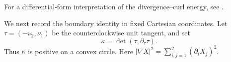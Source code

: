 For a differential-form interpretation of the divergence--curl energy,
see \cite[Section 5.1]{FGM26}.

We next record the boundary identity in fixed Cartesian coordinates.
Let $\tau=(-\nu_2,\nu_1)$ be the counterclockwise unit tangent, and set
\[
 \kappa=\det(\tau,\partial_\tau\tau).
\]
Thus $\kappa$ is positive on a convex circle. Here
$|\nabla X|^2=\sum_{i,j=1}^2(\partial_iX_j)^2$.

